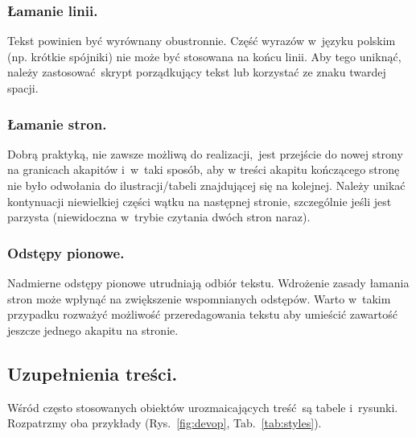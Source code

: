 \subsubsection{Łamanie linii.}
\label{subsubsec:linebreak}

Tekst powinien być wyrównany obustronnie. Część wyrazów w~języku polskim (np. krótkie spójniki) nie może być stosowana na końcu linii. Aby tego uniknąć, należy zastosować skrypt porządkujący tekst lub korzystać ze znaku twardej spacji.

\subsubsection{Łamanie stron.}
\label{subsubsec:pagebreak}

Dobrą praktyką, nie zawsze możliwą do realizacji, jest przejście do nowej strony na granicach akapitów i~w~taki sposób, aby w treści akapitu kończącego stronę nie było odwołania do ilustracji/tabeli znajdującej się na kolejnej. Należy unikać kontynuacji niewielkiej części wątku na następnej stronie, szczególnie jeśli jest parzysta (niewidoczna w~trybie czytania dwóch stron naraz).

\subsubsection{Odstępy pionowe.}
\label{subsubsec:verticalSpace}

Nadmierne odstępy pionowe utrudniają odbiór tekstu. Wdrożenie zasady łamania stron może wpłynąć na zwiększenie wspomnianych odstępów. Warto w~takim przypadku rozważyć możliwość przeredagowania tekstu aby umieścić zawartość jeszcze jednego akapitu na stronie.

\subsection{Uzupełnienia treści.}
\label{subsec:additions}

Wśród często stosowanych obiektów urozmaicających treść są tabele i~rysunki. Rozpatrzmy oba przykłady (Rys.~\ref{fig:devop}, Tab.~\ref{tab:styles}).

